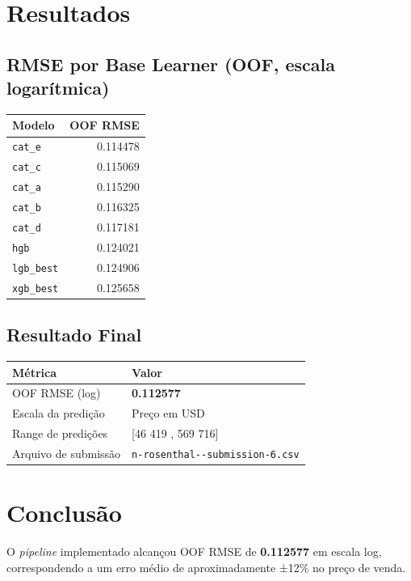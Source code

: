 \documentclass[12pt,a4paper]{article}
\begin{document}
\section{Resultados}
\label{sec:org7ea2461}

\subsection{RMSE por Base Learner (OOF, escala logarítmica)}
\label{sec:orgf807026}

\begin{center}
\begin{tabular}{lr}
Modelo & OOF RMSE\\
\hline
\texttt{cat\_e} & 0.114478\\
\texttt{cat\_c} & 0.115069\\
\texttt{cat\_a} & 0.115290\\
\texttt{cat\_b} & 0.116325\\
\texttt{cat\_d} & 0.117181\\
\texttt{hgb} & 0.124021\\
\texttt{lgb\_best} & 0.124906\\
\texttt{xgb\_best} & 0.125658\\
\end{tabular}
\end{center}
\subsection{Resultado Final}
\label{sec:org4c007f7}

\begin{center}
\begin{tabular}{ll}
Métrica & Valor\\
\hline
OOF RMSE (log) & \textbf{0.112577}\\
Escala da predição & Preço em USD\\
Range de predições & {[}46 419 , 569 716]\\
Arquivo de submissão & \texttt{n-rosenthal-{}-{}submission-6.csv}\\
\end{tabular}
\end{center}
\section{Conclusão}
\label{sec:org3cdf2a8}

O \emph{pipeline} implementado alcançou OOF RMSE de \textbf{0.112577} em escala log,
correspondendo a um erro médio de aproximadamente ±12\% no preço de venda.
\end{document}
